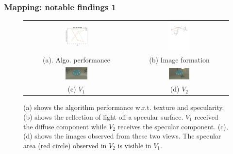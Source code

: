 \documentclass{beamer}
\begin{document}
\begin{frame}
\frametitle{Mapping: notable findings 1}

\begin{figure}[!htbp]
\begin{tabular}{cc}
\includegraphics[width=0.22\textwidth]{mapping/depend_check/mvs_tex_spec}&
\includegraphics[width=0.22\textwidth]{mapping/mvs_spec/mvs_spec}\\
(a). Algo. performance & (b) Image formation\\
\includegraphics[width=0.22\textwidth]{mapping/mvs_spec/mvs_spec_01}&
\includegraphics[width=0.22\textwidth]{mapping/mvs_spec/mvs_spec_00}\\
(c) $V_1$ & (d) $V_2$\\
\end{tabular}
\caption{(a) shows the algorithm performance w.r.t. texture and specularity. (b) shows the reflection of light off a specular surface. $V_1$ received the diffuse component while $V_2$ receives the specular component. (c), (d) shows the images observed from these two views. The specular area (red circle) observed in $V_2$ is visible in $V_1$.}
\end{figure}

\end{frame}
\end{document}
